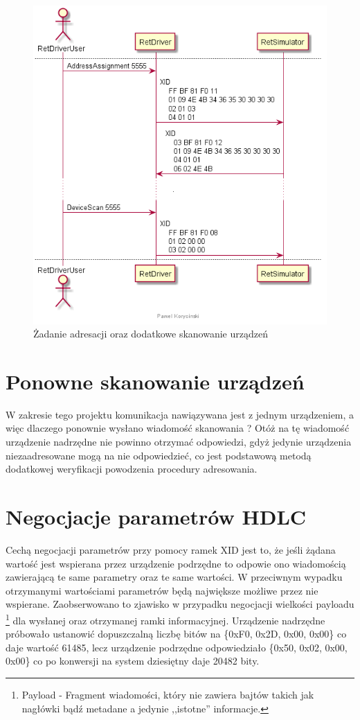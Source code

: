     \begin{figure}[h!]
    \centering
    \includegraphics[scale=0.75]{out/Diagramy/UML_DiagramOfSequence_New/KalibracjaRETa-page2.png}
    \caption{Żadanie adresacji oraz dodatkowe skanowanie urządzeń}
    \end{figure}

    \section{Ponowne skanowanie urządzeń}
    W zakresie tego projektu komunikacja nawiązywana jest z jednym urządzeniem, a więc dlaczego
    ponownie wysłano wiadomość skanowania ? Otóż na tę wiadomość urządzenie nadrzędne
    nie powinno otrzymać odpowiedzi, gdyż jedynie urządzenia niezaadresowane mogą na nie 
    odpowiedzieć, co jest podstawową metodą dodatkowej weryfikacji powodzenia procedury
    adresowania.

    \section{Negocjacje parametrów HDLC}
    Cechą negocjacji parametrów przy pomocy ramek XID jest to, że jeśli żądana wartość jest wspierana przez
    urządzenie podrzędne to odpowie ono wiadomością zawierającą te same parametry oraz te same wartości. 
    W przeciwnym wypadku otrzymanymi wartościami parametrów będą największe możliwe przez nie wspierane.
    Zaobserwowano to zjawisko w przypadku negocjacji wielkości payloadu
    \footnote{\label{Payload} Payload - Fragment wiadomości, który nie zawiera bajtów takich jak nagłówki bądź metadane a jedynie ,,istotne''
    informacje.} dla wysłanej oraz otrzymanej ramki informacyjnej.
    Urządzenie nadrzędne próbowało ustanowić dopuszczalną liczbę bitów na \{0xF0, 0x2D, 0x00, 0x00\} co daje wartość 61485,
    lecz urządzenie podrzędne odpowiedziało \{0x50, 0x02, 0x00, 0x00\} co po konwersji na system dziesiętny daje 20482 bity.

